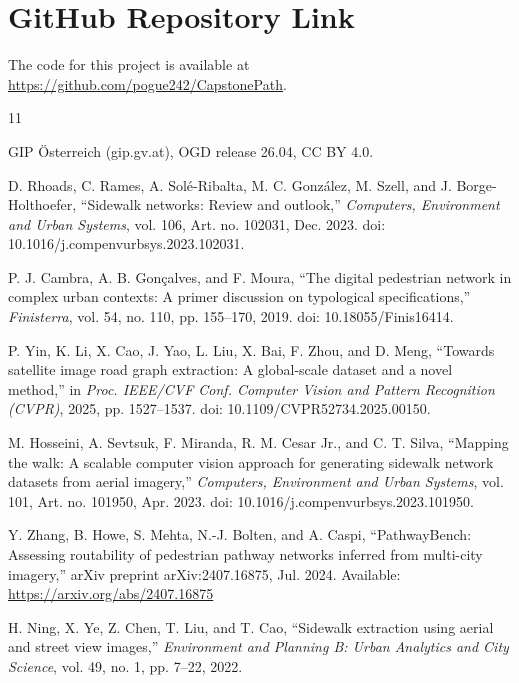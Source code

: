 \documentclass[conference]{IEEEtran}
\begin{document}
\section{GitHub Repository Link}

The code for this project is available at \url{https://github.com/pogue242/CapstonePath}.



\begin{thebibliography}{11}

GIP Österreich (gip.gv.at), OGD release 26.04, CC BY 4.0.

D. Rhoads, C. Rames, A. Sol\'e-Ribalta,
M. C. Gonz\'alez, M. Szell, and
J. Borge-Holthoefer,
``Sidewalk networks: Review and outlook,''
\emph{Computers, Environment and Urban Systems},
vol. 106, Art. no. 102031, Dec. 2023.
doi: 10.1016/j.compenvurbsys.2023.102031.

P. J. Cambra, A. B. Gon\c{c}alves,
and F. Moura,
``The digital pedestrian network in complex
urban contexts: A primer discussion on
typological specifications,''
\emph{Finisterra},
vol. 54, no. 110, pp. 155--170, 2019.
doi: 10.18055/Finis16414.

P. Yin, K. Li, X. Cao, J. Yao,
L. Liu, X. Bai, F. Zhou, and D. Meng,
``Towards satellite image road graph extraction:
A global-scale dataset and a novel method,''
in \emph{Proc. IEEE/CVF Conf. Computer Vision
and Pattern Recognition (CVPR)},
2025, pp. 1527--1537.
doi: 10.1109/CVPR52734.2025.00150.

M. Hosseini, A. Sevtsuk, F. Miranda,
R. M. Cesar Jr., and C. T. Silva,
``Mapping the walk: A scalable computer vision
approach for generating sidewalk network
datasets from aerial imagery,''
\emph{Computers, Environment and Urban Systems},
vol. 101, Art. no. 101950, Apr. 2023.
doi: 10.1016/j.compenvurbsys.2023.101950.

Y. Zhang, B. Howe, S. Mehta,
N.-J. Bolten, and A. Caspi,
``PathwayBench: Assessing routability of
pedestrian pathway networks inferred from
multi-city imagery,''
arXiv preprint arXiv:2407.16875, Jul. 2024. Available:
\url{https://arxiv.org/abs/2407.16875}

H. Ning, X. Ye, Z. Chen, T. Liu, and T. Cao,
``Sidewalk extraction using aerial and street view images,''
\emph{Environment and Planning B: Urban Analytics and City Science},
vol. 49, no. 1, pp. 7--22, 2022.


\end{thebibliography}
\end{document}
